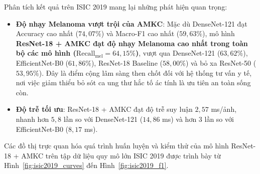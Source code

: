 \begin{table}[H]
\centering
\caption{Kết quả đối sánh các mô hình trên tập kiểm thử ISIC 2019 (Seed 42, TTA)}
\label{tab:isic2019_results}
\small
\setlength{\tabcolsep}{4pt}
\end{table}

Phân tích kết quả trên ISIC 2019 mang lại những phát hiện quan trọng:
\begin{itemize}
  \item \textbf{Độ nhạy Melanoma vượt trội của AMKC}: Mặc dù DenseNet-121 đạt Accuracy cao nhất ($74{,}07\%$) và Macro-F1 cao nhất ($59{,}63\%$), mô hình \textbf{ResNet-18 + AMKC đạt độ nhạy Melanoma cao nhất trong toàn bộ các mô hình ($\mathrm{Recall}_{\mathrm{mel}} = 64{,}15\%$)}, vượt qua DenseNet-121 ($63{,}62\%$), EfficientNet-B0 ($61{,}86\%$), ResNet-18 Baseline ($58{,}00\%$) và bỏ xa ResNet-50 ($53{,}95\%$). Đây là điểm cộng lâm sàng then chốt đối với hệ thống tư vấn y tế, nơi việc giảm thiểu bỏ sót ca ung thư hắc tố ác tính là ưu tiên an toàn sống còn.
  \item \textbf{Độ trễ tối ưu}: ResNet-18 + AMKC đạt độ trễ suy luận $2{,}57$ ms/ảnh, nhanh hơn $5{,}8$ lần so với DenseNet-121 ($14{,}86$ ms) và hơn $3$ lần so với EfficientNet-B0 ($8{,}17$ ms).
\end{itemize}

Các đồ thị trực quan hóa quá trình huấn luyện và kiểm thử của mô hình ResNet-18 + AMKC trên tập dữ liệu quy mô lớn ISIC 2019 được trình bày từ Hình~\ref{fig:isic2019_curves} đến Hình~\ref{fig:isic2019_f1}.

